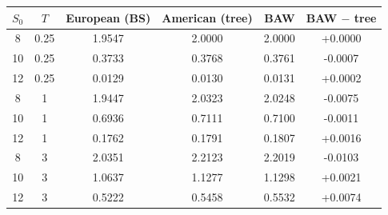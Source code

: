 \begin{tabular}{ccccrc}
\toprule
$S_0$ & $T$ & European (BS) & American (tree) & BAW & BAW $-$ tree \\
\midrule
8 & 0.25 & 1.9547 & 2.0000 & 2.0000 & +0.0000 \\
10 & 0.25 & 0.3733 & 0.3768 & 0.3761 & -0.0007 \\
12 & 0.25 & 0.0129 & 0.0130 & 0.0131 & +0.0002 \\
8 & 1 & 1.9447 & 2.0323 & 2.0248 & -0.0075 \\
10 & 1 & 0.6936 & 0.7111 & 0.7100 & -0.0011 \\
12 & 1 & 0.1762 & 0.1791 & 0.1807 & +0.0016 \\
8 & 3 & 2.0351 & 2.2123 & 2.2019 & -0.0103 \\
10 & 3 & 1.0637 & 1.1277 & 1.1298 & +0.0021 \\
12 & 3 & 0.5222 & 0.5458 & 0.5532 & +0.0074 \\
\bottomrule
\end{tabular}
